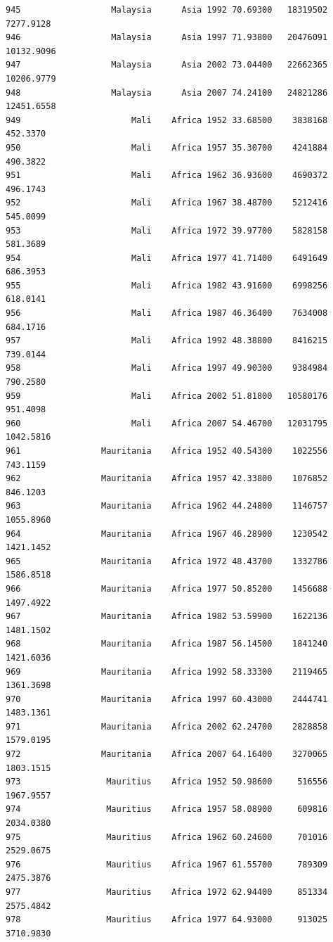 \documentclass[
  letterpaper,
  DIV=11,
  numbers=noendperiod]{scrreprt}
\begin{document}
\begin{verbatim}
945                  Malaysia      Asia 1992 70.69300   18319502   7277.9128
946                  Malaysia      Asia 1997 71.93800   20476091  10132.9096
947                  Malaysia      Asia 2002 73.04400   22662365  10206.9779
948                  Malaysia      Asia 2007 74.24100   24821286  12451.6558
949                      Mali    Africa 1952 33.68500    3838168    452.3370
950                      Mali    Africa 1957 35.30700    4241884    490.3822
951                      Mali    Africa 1962 36.93600    4690372    496.1743
952                      Mali    Africa 1967 38.48700    5212416    545.0099
953                      Mali    Africa 1972 39.97700    5828158    581.3689
954                      Mali    Africa 1977 41.71400    6491649    686.3953
955                      Mali    Africa 1982 43.91600    6998256    618.0141
956                      Mali    Africa 1987 46.36400    7634008    684.1716
957                      Mali    Africa 1992 48.38800    8416215    739.0144
958                      Mali    Africa 1997 49.90300    9384984    790.2580
959                      Mali    Africa 2002 51.81800   10580176    951.4098
960                      Mali    Africa 2007 54.46700   12031795   1042.5816
961                Mauritania    Africa 1952 40.54300    1022556    743.1159
962                Mauritania    Africa 1957 42.33800    1076852    846.1203
963                Mauritania    Africa 1962 44.24800    1146757   1055.8960
964                Mauritania    Africa 1967 46.28900    1230542   1421.1452
965                Mauritania    Africa 1972 48.43700    1332786   1586.8518
966                Mauritania    Africa 1977 50.85200    1456688   1497.4922
967                Mauritania    Africa 1982 53.59900    1622136   1481.1502
968                Mauritania    Africa 1987 56.14500    1841240   1421.6036
969                Mauritania    Africa 1992 58.33300    2119465   1361.3698
970                Mauritania    Africa 1997 60.43000    2444741   1483.1361
971                Mauritania    Africa 2002 62.24700    2828858   1579.0195
972                Mauritania    Africa 2007 64.16400    3270065   1803.1515
973                 Mauritius    Africa 1952 50.98600     516556   1967.9557
974                 Mauritius    Africa 1957 58.08900     609816   2034.0380
975                 Mauritius    Africa 1962 60.24600     701016   2529.0675
976                 Mauritius    Africa 1967 61.55700     789309   2475.3876
977                 Mauritius    Africa 1972 62.94400     851334   2575.4842
978                 Mauritius    Africa 1977 64.93000     913025   3710.9830

\end{verbatim}
\end{document}
